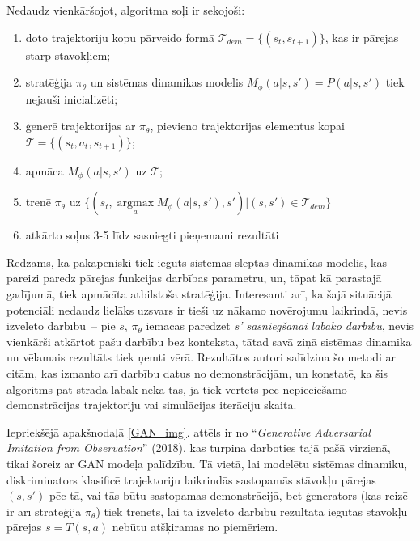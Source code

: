 \documentclass[12pt, a4paper]{article}
\numberwithin{equation}{section} %
\begin{document}
Nedaudz vienkāršojot, algoritma soļi ir sekojoši:

\begin{enumerate}
    \item doto trajektoriju kopu pārveido formā $\mathcal{T}_{dem}=\lbrace (s_t, s_{t+1}) \rbrace$, kas ir pārejas starp stāvokļiem;
    \item stratēģija $\pi_{\theta}$ un sistēmas dinamikas modelis $M_{\phi}(a \vert s,s')=P(a \vert s, s')$ tiek nejauši inicializēti;
    \item ģenerē trajektorijas ar $\pi_{\theta}$, pievieno trajektorijas elementus kopai $\mathcal{T}=\lbrace (s_t, a_t, s_{t+1}) \rbrace$;
    \item apmāca $M_{\phi}(a \vert s, s')$ uz $\mathcal{T}$;
    \item trenē $\pi_{\theta}$ uz $\lbrace (s_t, \operatorname*{argmax}\limits_a M_{\phi}(a \vert s, s'), s')\vert (s, s') \in \mathcal{T}_{dem} \rbrace$
    \item atkārto soļus 3-5 līdz sasniegti pieņemami rezultāti
\end{enumerate}

Redzams, ka pakāpeniski tiek iegūts sistēmas slēptās dinamikas modelis, kas pareizi paredz pārejas funkcijas darbības parametru, un, tāpat kā parastajā gadījumā, tiek apmācīta atbilstoša stratēģija. Interesanti arī, ka šajā situācijā potenciāli nedaudz lielāks uzsvars ir tieši uz nākamo novērojumu laikrindā, nevis izvēlēto darbību~-- pie $s$, $\pi_{\theta}$ iemācās paredzēt \textit{s' sasniegšanai labāko darbību}, nevis vienkārši atkārtot pašu darbību bez konteksta, tātad savā ziņā sistēmas dinamika un vēlamais rezultāts tiek ņemti vērā. Rezultātos autori salīdzina šo metodi ar citām, kas izmanto arī darbību datus no demonstrācijām, un konstatē, ka šis algoritms pat strādā labāk nekā tās, ja tiek vērtēts pēc nepieciešamo demonstrācijas trajektoriju vai simulācijas iterāciju skaita.

Iepriekšējā apakšnodaļā \ref{GAN_img}. attēls ir no ``\textit{Generative Adversarial Imitation from Observation}'' \cite{torabi2018behavioral} (2018), kas turpina darboties tajā pašā virzienā, tikai šoreiz ar GAN modeļa palīdzību. Tā vietā, lai modelētu sistēmas dinamiku, diskriminators klasificē trajektoriju laikrindās sastopamās stāvokļu pārejas $(s, s')$ pēc tā, vai tās būtu sastopamas demonstrācijā, bet ģenerators (kas reizē ir arī stratēģija $\pi_{\theta}$) tiek trenēts, lai tā izvēlēto darbību rezultātā iegūtās stāvokļu pārejas $s=T(s,a)$ nebūtu atšķiramas no piemēriem.
\end{document}
